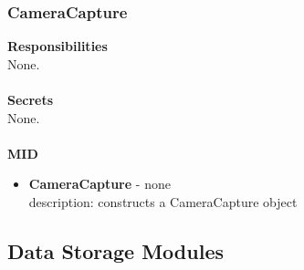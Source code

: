 \documentclass[11pt]{article}
\begin{document}
\subsubsection*{CameraCapture}
\textbf{Responsibilities} \\
None. \\ \\
\textbf{Secrets} \\
None. \\ \\
\textbf{MID}
\begin{itemize}
\item \textbf{CameraCapture} - none\\ description: constructs a CameraCapture object
\end{itemize}

\subsection{Data Storage Modules}
\end{document}
